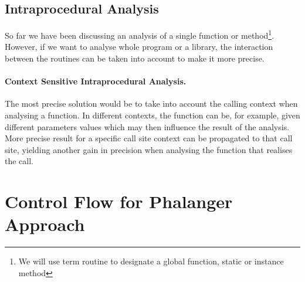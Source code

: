         
        \paragraph*{}

        \subsection{Intraprocedural Analysis}
        So far we have been discussing an analysis of a 
        single function or method\footnote{We will use term 
        routine to designate a global function, static or instance method}. 
        However, if we want to analyse whole program or 
        a library, the interaction between the routines 
        can be taken into account to make it more precise.
        
        \paragraph{Context Sensitive Intraprocedural Analysis.}
        The most precise solution would be to take into account 
        the calling context when analysing a function. 
        In different contexts, the function can be, 
        for example, given different parameters values 
        which may then influence the result of the analysis. 
        More precise result for a specific call site context 
        can be propagated to that call site, 
        yielding another gain in precision when 
        analysing the function that realises the call.
        
        \paragraph*{}
    
    \section{Control Flow for Phalanger Approach}
        
